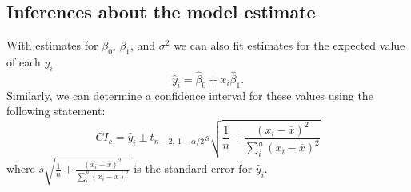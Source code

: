 \documentclass{article}
\begin{document}
\subsection{Inferences about the model estimate}
With estimates for \(\beta_0\), \(\beta_1\), and \(\sigma^2\) we can also fit estimates for
the expected value of each \(y_i\)
\begin{equation*}
    \hat{y}_i = \hat{\beta}_0 + x_i \hat{\beta}_1.
\end{equation*}
Similarly, we can determine a confidence interval for these values using the following statement:
\begin{equation*}
    CI_c = \hat{y}_i \pm t_{n-2,\: 1-\alpha/2} s \sqrt{\frac{1}{n} + \frac{\left( x_i - \overline{x} \right)^2}{\sum_i^n \left( x_i - \overline{x} \right)^2}}
\end{equation*}
where \(s\sqrt{\frac{1}{n} + \frac{\left( x_i - \overline{x} \right)^2}{\sum_i^n \left( x_i - \overline{x} \right)^2}}\) 
is the standard error for \(\hat{y}_i\).
\end{document}
